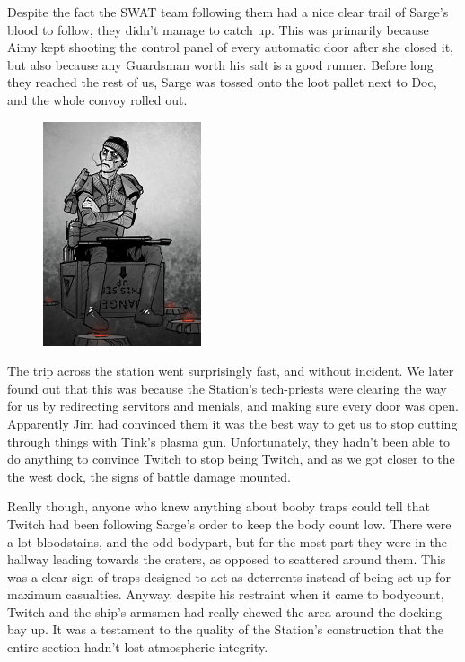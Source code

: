 Despite the fact the SWAT team following them had a nice clear trail of Sarge's blood to follow, they didn't manage to catch up. 
This was primarily because Aimy kept shooting the control panel of every automatic door after she closed it, but also because any Guardsman worth his salt is a good runner. 
Before long they reached the rest of us, Sarge was tossed onto the loot pallet next to Doc, and the whole convoy rolled out.

\begin{figure}
	\begin{center}
		\includegraphics[width=\figwidth]{pics/14/47.png}
	\end{center}
\end{figure}
The trip across the station went surprisingly fast, and without incident. 
We later found out that this was because the Station's tech-priests were clearing the way for us by redirecting servitors and menials, and making sure every door was open. 
Apparently Jim had convinced them it was the best way to get us to stop cutting through things with Tink's plasma gun. 
Unfortunately, they hadn't been able to do anything to convince Twitch to stop being Twitch, and as we got closer to the the west dock, the signs of battle damage mounted.

Really though, anyone who knew anything about booby traps could tell that Twitch had been following Sarge's order to keep the body count low. 
There were a lot bloodstains, and the odd bodypart, but for the most part they were in the hallway leading towards the craters, as opposed to scattered around them. 
This was a clear sign of traps designed to act as deterrents instead of being set up for maximum casualties. 
Anyway, despite his restraint when it came to bodycount, Twitch and the ship's armsmen had really chewed the area around the docking bay up. 
It was a testament to the quality of the Station's construction that the entire section hadn't lost atmospheric integrity.

